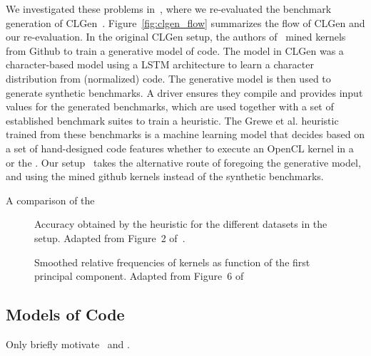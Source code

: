 We investigated these problems in~\cite{goens_mapl19}, where we re-evaluated the benchmark generation of CLGen~\cite{cummins_cgo17}.
Figure~\ref{fig:clgen_flow} summarizes the flow of CLGen and our re-evaluation.
In the original CLGen setup, the authors of~\cite{cumins_cgo17} mined kernels from Github to train a generative model of code.
The model in CLGen was a character-based model using a \ac{LSTM}\cite{lstm} architecture to learn a character distribution from (normalized) code.
The generative model is then used to generate synthetic benchmarks. A driver ensures they compile and provides input values for the generated benchmarks, which are used together with a set of established benchmark suites to train a heuristic.
The Grewe et al. heuristic~\cite{grewe} trained from these benchmarks is a machine learning model that decides based on a set of hand-designed code features whether to execute an OpenCL kernel in a  or the . 
Our setup~\cite{goens_mapl19} takes the alternative route of foregoing the generative model, and using the mined github kernels instead of the synthetic benchmarks.

A comparison of the 
\begin{figure}[h]
	\centering
\resizebox{0.95\textwidth}{!}{
     
     }
   \caption{Accuracy obtained by the heuristic for the different datasets in the setup. Adapted from Figure~2 of~\cite{goens_mapl19}.}
   \label{fig:clgen_accuracy}
\end{figure}

\begin{figure}[h]
	\centering
\resizebox{0.95\textwidth}{!}{
     
     }
   \caption{Smoothed relative frequencies of kernels as function of the first principal component. Adapted from Figure~6 of~\cite{goens_mapl19}}
   \label{fig:clgen_pca}
\end{figure}

\subsection{Models of Code}

Only briefly motivate~\cite{brauckmann_cc20} and \cite{brauckmann_fdl20}.

